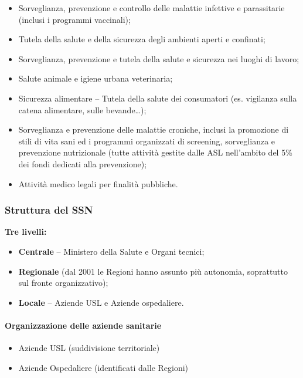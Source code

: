 \begin{itemize}
\item
  Sorveglianza, prevenzione e controllo delle malattie infettive e
  parassitarie (inclusi i programmi vaccinali);
\item
  Tutela della salute e della sicurezza degli ambienti aperti e
  confinati;
\item
  Sorveglianza, prevenzione e tutela della salute e sicurezza nei luoghi
  di lavoro;
\item
  Salute animale e igiene urbana veterinaria;
\item
  Sicurezza alimentare -- Tutela della salute dei consumatori (es.
  vigilanza sulla catena alimentare, sulle bevande\ldots{});
\item
  Sorveglianza e prevenzione delle malattie croniche, inclusi la
  promozione di stili di vita sani ed i programmi organizzati di
  screening, sorveglianza e prevenzione nutrizionale (tutte attività
  gestite dalle ASL nell'ambito del 5\% dei fondi dedicati alla
  prevenzione);
\item
  Attività medico legali per finalità pubbliche.
\end{itemize}

\subsubsection{Struttura del SSN}

\textbf{Tre livelli:}

\begin{itemize}
\item
  \textbf{Centrale} -- Ministero della Salute e Organi tecnici;
\item
  \textbf{Regionale} (dal 2001 le Regioni hanno assunto più autonomia,
  soprattutto sul fronte organizzativo);
\item
  \textbf{Locale} -- Aziende USL e Aziende ospedaliere.
\end{itemize}

\paragraph{Organizzazione delle aziende sanitarie}

\begin{itemize}
\item Aziende USL (suddivisione territoriale)
\item Aziende Ospedaliere (identificati dalle Regioni)
\end{itemize}

